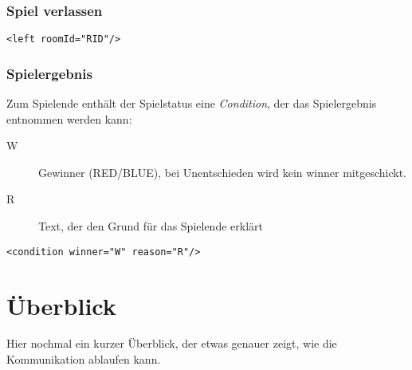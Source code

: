 \documentclass[12pt,a4paper, ngerman, oneside]{scrartcl}
\begin{document}
\section{Spiel verlassen}
\begin{verbatim}
<left roomId="RID"/>
\end{verbatim}


\section{\label{gameend}Spielergebnis}
Zum Spielende enthält der Spielstatus eine \textit{Condition}, der das Spielergebnis entnommen werden kann:
\begin{description}
\item[W] Gewinner (RED/BLUE), bei Unentschieden wird kein winner mitgeschickt.
\item[R] Text, der den Grund für das Spielende erklärt
\end{description}
\begin{verbatim}
<condition winner="W" reason="R"/>
\end{verbatim}

\newpage
\part{Überblick}
Hier nochmal ein kurzer Überblick, der etwas genauer zeigt, wie die Kommunikation ablaufen kann.\bigskip\\
\end{document}
